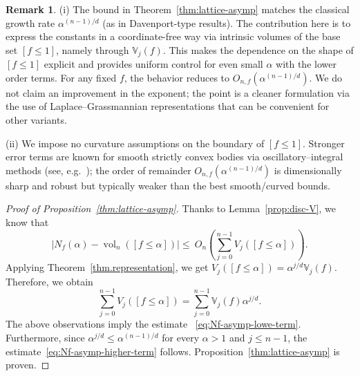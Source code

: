 \documentclass[11pt]{article}
\theoremstyle{definition}
\numberwithin{equation}{section}
\newtheorem{remark}[theorem]{Remark}
\newcommand{\opV}{\mathds{V}}       %
\DeclareMathOperator{\vol}{vol}
\begin{document}
\begin{remark}\normalfont
(i)
The bound in Theorem~\ref{thm:lattice-asymp} matches the classical growth rate $\alpha^{(n-1)/d}$ (as in Davenport-type results). 
The contribution here is to express the constants in a coordinate-free way via intrinsic volumes of the base set ${[f \leq 1]}$, namely through $\opV_j(f)$. 
This makes the dependence on the shape of $[f\le 1]$ explicit and provides uniform control for even small $\alpha$ with the lower order terms. 
For any fixed $f$, the behavior reduces to ${O_{n,f}(\alpha^{(n-1)/d})}$.
We do not claim an improvement in the exponent; the point is a cleaner formulation via the use of Laplace--Grassmannian representations that can be convenient for other variants.

\medskip

(ii)
We impose no curvature assumptions on the boundary of $[f\le1]$.
Stronger error terms are known for smooth strictly convex bodies via oscillatory–integral methods (see, e.g.~\cite{Huxley1996, IvicKratzelKuehleitnerNowak2006, Kratzel1989}); the order of remainder $O_{n, f}(\textstyle\alpha^{(n-1)/d})$ is dimensionally sharp and robust but typically weaker than the best smooth/curved bounds.  
\end{remark}

\begin{proof}[Proof of Proposition~\ref{thm:lattice-asymp}]
Thanks to Lemma~\ref{prop:disc-V}, we know that
\begin{equation}\label{eq:disc-sumVj}
  \bigl| N_f(\alpha)-\vol_n([f \leq \alpha]) \bigr|
  \le\ O_n \left( \sum_{j=0}^{n-1} V_j([f \leq \alpha]) \right).
\end{equation}
Applying Theorem~\ref{thm.representation}, we get $V_j([f \leq \alpha]) = \alpha^{j/d} \opV_j(f)$.
Therefore, we obtain
\[
  \sum_{j=0}^{n-1} V_j([f \leq \alpha])
 = \sum_{j = 0}^{n - 1} \opV_j(f) \alpha^{j/d}.
\]
The above observations imply the estimate ~\eqref{eq:Nf-asymp-lowe-term}.
Furthermore, since $\alpha^{j/d} \leq \alpha^{(n - 1)/d}$ for every $\alpha > 1$ and $j \leq n - 1$, the estimate~\eqref{eq:Nf-asymp-higher-term} follows.
Proposition~\ref{thm:lattice-asymp} is proven.
\end{proof}

\end{document}
